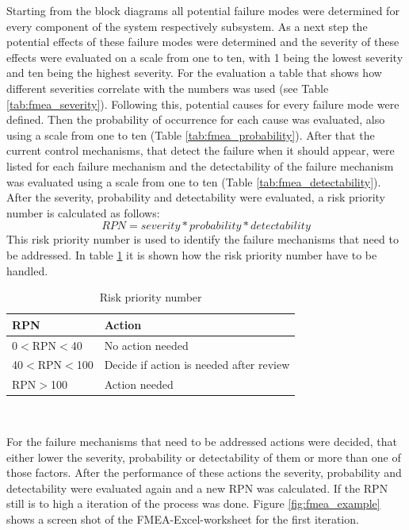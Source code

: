\documentclass[ExampleMasters.tex]{subfiles}
\begin{document}
Starting from the block diagrams all potential failure modes were determined for every component of the system respectively subsystem. As a next step the potential effects of these failure modes were determined and the severity of these effects were evaluated on a scale from one to ten,  with 1 being the lowest severity and ten being the highest severity. For the evaluation a table that shows how different severities correlate with the numbers was used (see Table \ref{tab:fmea_severity}). 
Following this, potential causes for every failure mode were defined. Then the probability of occurrence for each cause was evaluated, also using a scale from one to ten (Table \ref{tab:fmea_probability}).
After that the current control mechanisms, that detect the failure when it should appear, were listed for each failure mechanism and the detectability of the failure mechanism was evaluated using a scale from one to ten (Table \ref{tab:fmea_detectability}).
After the severity, probability and detectability were evaluated, a risk priority number is calculated as follows: 
\begin{equation*}
RPN=severity*probability*detectability
\end{equation*}      
This risk priority number is used to identify the failure mechanisms that need to be addressed. In table \ref{tab:RPN} it is shown how the risk priority number have to be handled.
\begin{table}[h]
	\centering
	\caption{Risk priority number}
	\label{tab:RPN}
	\begin{tabular}{l|l|}
		RPN   & Action  \\ \hline
		0$<$RPN$<$40     &       No action needed           \\
		40$<$RPN$<$100   &      Decide if action is needed after review      \\
		RPN$>$100 &      Action needed         \\
		
	\end{tabular} \\
\end{table}
For the failure mechanisms that need to be addressed actions were decided, that either lower the severity, probability or detectability of them or more than one of those factors. After the performance of these actions the severity, probability and detectability were evaluated again and a new RPN was calculated. If the RPN still is to high a iteration of the process was done.
Figure \ref{fig:fmea_example} shows a screen shot of the FMEA-Excel-worksheet for the first iteration.    
\end{document}
